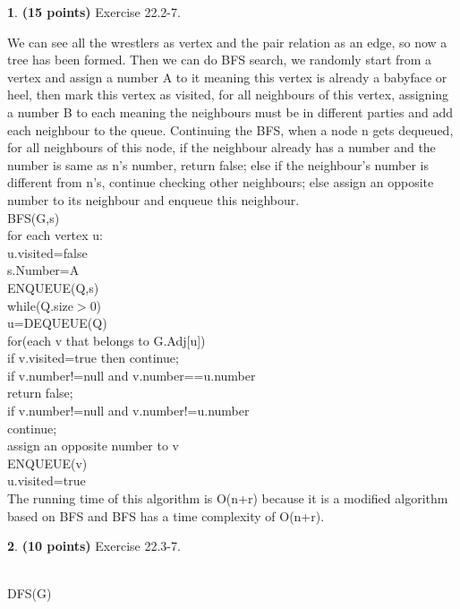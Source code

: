 \documentclass[11pt]{article}
\theoremstyle{definition}
\theoremstyle{theorem}
\newtheorem{prob}{}
\newcommand{\solution}{\medskip\noindent{\color{DarkBlue}\textbf{Solution:}}}
\begin{document}
\begin{prob} \textbf{(15 points)} Exercise 22.2-7.
\end{prob}
\solution
We can see all the wrestlers as vertex and the pair relation as an edge, so now a tree has been formed. Then we can do BFS search, we randomly start from a vertex and assign a number A to it meaning this vertex is already a babyface or heel, then mark this vertex as visited, for all neighbours of this vertex, assigning a number B to each meaning the neighbours must be in different parties and add each neighbour to the queue. Continuing the BFS, when a node n gets dequeued, for all neighbours of this node, if the neighbour already has a number and the number is same as n's number, return false; else if the neighbour's number is different from n's, continue checking other neighbours; else assign an opposite number to its neighbour and enqueue this neighbour.\\
BFS(G,s)\\
\null\qquad for each vertex u:\\
\null\qquad\qquad u.visited=false\\
\null\qquad s.Number=A\\
\null\qquad ENQUEUE(Q,s)\\
\null\qquad while(Q.size$>$0)\\
\null\qquad\qquad u=DEQUEUE(Q)\\
\null\qquad\qquad for(each v that belongs to G.Adj[u])\\
\null\qquad\qquad\qquad if v.visited=true then continue;\\
\null\qquad\qquad\qquad if v.number!=null and v.number==u.number\\
\null\qquad\qquad\qquad\qquad return false;\\
\null\qquad\qquad\qquad if v.number!=null and v.number!=u.number\\
\null\qquad\qquad\qquad\qquad continue;\\
\null\qquad\qquad\qquad assign an opposite number to v\\
\null\qquad\qquad\qquad ENQUEUE(v)\\
\null\qquad\qquad u.visited=true\\
The running time of this algorithm is O(n+r) because it is a modified algorithm based on BFS and BFS has a time complexity of O(n+r).
\begin{prob} \textbf{(10 points)} Exercise 22.3-7.
\end{prob}
\solution\\
DFS(G)\\
\end{document}
